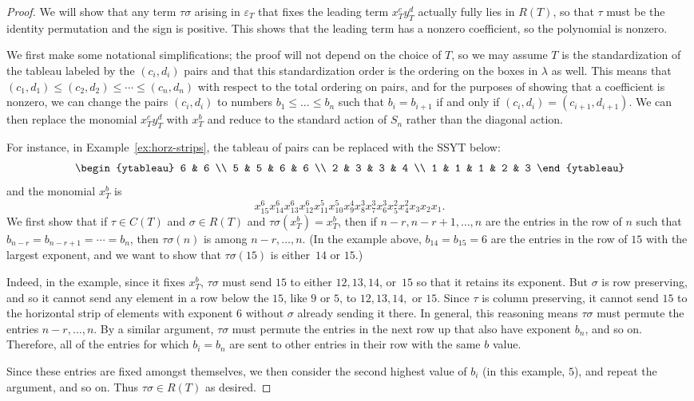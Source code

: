 \begin{proof}
	We will show that any term $\tau\sigma$ arising in $\varepsilon_T$ that fixes the leading term $x_T^c y_T^d$ actually fully lies in $R(T)$, so that $\tau$ must be the identity permutation and the sign is positive.  This shows that the leading term has a nonzero coefficient, so the polynomial is nonzero.
	
	We first make some notational simplifications; the proof will not depend on the choice of $T$, so we may assume $T$ is the standardization of the tableau labeled by the $(c_i,d_i)$ pairs and that this standardization order is the ordering on the boxes in $\lambda$ as well.  This means that $(c_1,d_1)\le (c_2,d_2)\le \cdots \le (c_n,d_n)$ with respect to the total ordering on pairs, and for the purposes of showing that a coefficient is nonzero, we can change the pairs $(c_i,d_i)$ to numbers $b_1\le \ldots\le b_n$ such that $b_i=b_{i+1}$ if and only if $(c_i,d_i)=(c_{i+1},d_{i+1})$.  We can then replace the monomial $x_T^cy_T^d$ with $x_T^b$ and reduce to the standard action of $S_n$ rather than the diagonal action.  
	
	For instance, in Example~\ref{ex:horz-strips}, the tableau of pairs can be replaced with the SSYT below:
	$$\begin{ytableau}
	6 & 6 \\
	5 & 5 & 6 & 6 \\
	2 & 3 & 3 & 4 \\
	1 & 1 & 1 & 2 & 3 
	\end{ytableau}$$
	and the monomial $x_T^b$ is $$x_{15}^6x_{14}^6x_{13}^6x_{12}^6x_{11}^5x_{10}^5x_{9}^4x_{8}^3x_7^3x_6^3x_5^2x_4^2x_3x_2x_1.$$
	We first show that if $\tau\in C(T)$ and $\sigma \in R(T)$ and $\tau\sigma(x_T^b)=x_T^b$, then if $n-r,n-r+1,\ldots,n$ are the entries in the row of $n$ such that $b_{n-r}=b_{n-r+1}=\cdots = b_n$, then  $\tau\sigma(n)$ is among $n-r,\ldots,n$.  (In the example above, $b_{14}=b_{15}=6$ are the entries in the row of $15$ with the largest exponent, and we want to show that $\tau\sigma(15)$ is either~$14$ or $15$.) 
	
	Indeed, in the example, since it fixes $x_T^b$, $\tau\sigma$ must send $15$ to either $12, 13, 14$, or~$15$ so that it retains its exponent.  But $\sigma$ is row preserving, and so it cannot send any element in a row below  the $15$, like $9$ or $5$, to $12, 13, 14,$ or $15$.  Since $\tau$ is column preserving, it cannot send $15$ to the horizontal strip of elements with exponent $6$ without $\sigma$ already sending it there.  In general, this reasoning means $\tau \sigma$ must permute the entries $n-r,\ldots,n$.
	By a similar argument, $\tau\sigma$ must permute the entries in the next row up that also have exponent $b_n$, and so on.  Therefore, all of the entries for which $b_i=b_n$ are sent to other entries in their row with the same $b$ value. 
	
	Since these entries are fixed amongst themselves, we then consider the second highest value of $b_i$ (in this example, $5$), and repeat the argument, and so on.  Thus $\tau\sigma\in R(T)$ as desired.
\end{proof}




